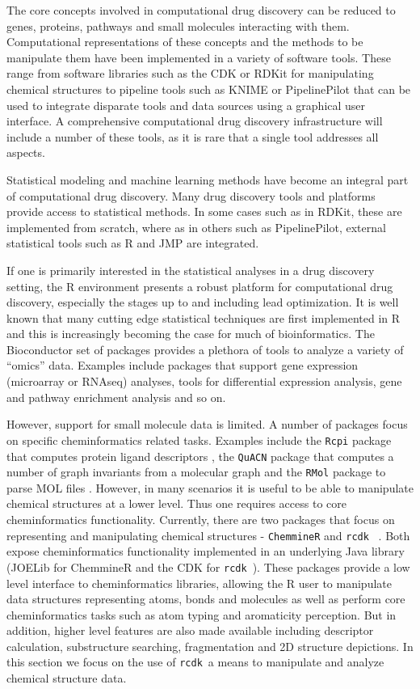 \documentclass[]{book}
\newcommand{\rcdk}{\texttt{rcdk}\ }
\begin{document}
The core concepts involved in computational drug discovery can be
reduced to genes, proteins, pathways and small molecules interacting
with them. Computational representations of these concepts and the
methods to be manipulate them have been implemented in a variety of
software tools. These range from software libraries such as the CDK
\cite{Steinbeck:2006aa} or RDKit \cite{RDKit:2008aa} for manipulating
chemical structures to pipeline tools such as KNIME
\cite{KNIME:2008aa} or PipelinePilot that can be used to integrate
disparate tools and data sources using a graphical user interface.  A
comprehensive computational drug discovery infrastructure will include
a number of these tools, as it is rare that a single tool addresses
all aspects. 

Statistical modeling and machine learning methods have become an
integral part of computational drug discovery. Many drug discovery
tools and platforms provide access to statistical methods. In some
cases such as in RDKit, these are implemented from scratch, where as
in others such as PipelinePilot, external statistical tools such as R
and JMP are integrated.

If one is primarily interested in the statistical analyses in a drug
discovery setting, the R environment presents a robust platform for
computational drug discovery, especially the stages up to and
including lead optimization.  It is well known that many cutting edge
statistical techniques are first implemented in R and this is
increasingly becoming the case for much of bioinformatics. The
Bioconductor set of packages provides a plethora of tools to analyze a
variety of ``omics'' data. Examples include packages that support gene
expression (microarray or RNAseq) analyses, tools for differential
expression analysis, gene and pathway enrichment analysis and so on.

However, support for small molecule data is limited. A number of
packages focus on specific cheminformatics related
tasks. Examples include the \texttt{Rcpi} package that computes
protein ligand descriptors \cite{Cao:2015uq} , the \texttt{QuACN} package that
computes a number of graph invariants \cite{Mueller:2011rz} from a
molecular graph and the \texttt{RMol} package to parse MOL files
\cite{Grabner:2012rr}. However, in many scenarios it is useful to
be able to manipulate chemical structures at a lower level. Thus one
requires access to core cheminformatics functionality. Currently,
there are two packages that focus on representing and manipulating
chemical structures - \texttt{ChemmineR} \cite{Cao:2008fj} and \rcdk
\cite{Guha:2007aa}. Both expose cheminformatics functionality
implemented in an underlying Java library (JOELib for ChemmineR and
the CDK for \rcdk). These packages provide a low level interface to
cheminformatics libraries, allowing the R user to manipulate data
structures representing atoms, bonds and molecules as well as perform
core cheminformatics tasks such as atom typing and aromaticity
perception. But in addition, higher level features are also made
available including descriptor calculation, substructure searching,
fragmentation and 2D structure depictions. In this section we focus on
the use of \rcdk a means to manipulate and analyze chemical structure
data.
\end{document}
